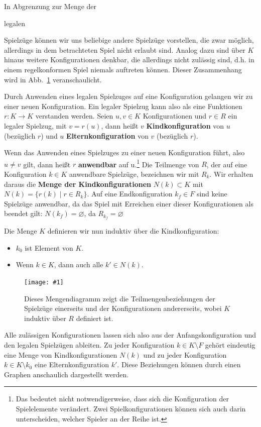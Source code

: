 \documentclass[a4paper]{scrartcl}
\let\emptyset\varnothing
\newcommand\e[1]{\begin{em}#1\end{em}}
\newcommand\g[4]{%
  \begin{figure}[!ht]
  \centering
  \texttt{[image: \#1]}
  \caption{#3\label{fig:#2}}
  \end{figure}}
\begin{document}
In Abgrenzung zur Menge der \e{legalen} Spielzüge können wir uns beliebige andere Spielzüge vorstellen, die zwar möglich, allerdings in dem betrachteten Spiel nicht erlaubt sind. Analog dazu sind über $K$ hinaus weitere Konfigurationen denkbar, die allerdings nicht zulässig sind, d.h. in einem regelkonformen Spiel niemals auftreten können. Dieser Zusammenhang wird in Abb.~\ref{fig:venn} veranschaulicht. 

Durch Anwenden eines legalen Spielzuges auf eine Konfiguration gelangen wir zu einer neuen Konfiguration. Ein legaler Spielzug kann also als eine Funktionen $r:K \to K$ verstanden werden. Seien $u,v \in K$ Konfigurationen und $r \in R$ ein legaler Spielzug, mit $v = r(u)$, dann heißt $v$ \textbf{Kindkonfiguration} von $u$ (bezüglich $r$) und $u$ \textbf{Elternkonfiguration} von $v$ (bezüglich $r$). 

Wenn das Anwenden eines Spielzuges zu einer neuen Konfiguration führt, also $u \neq v$ gilt, dann heißt $r$ \textbf{anwendbar} auf u.\footnote{Das bedeutet nicht notwendigerweise, dass sich die Konfiguration der Spielelemente verändert. Zwei Spielkonfigurationen können sich auch darin unterscheiden, welcher Spieler an der Reihe ist.} Die Teilmenge von $R$, der auf eine Konfiguration $k \in K$ anwendbare Spielzüge, bezeichnen wir mit $R_k$. Wir erhalten daraus die \textbf{Menge der Kindkonfigurationen} $N(k) \subset K$ mit $N(k) = \{r(k) \mid r \in R_k\}$. Auf eine Endkonfiguration $k_f \in F$ sind keine Spielzüge anwendbar, da das Spiel mit Erreichen einer dieser Konfigurationen als beendet gilt: $N(k_f) = \emptyset$, da $R_{k_f} = \emptyset$

Die Menge $K$ definieren wir nun induktiv über die Kindkonfiguration: 
\begin{itemize}
	\item $k_0$ ist Element von $K$.
	\item Wenn $k \in K$, dann auch alle $k' \in N(k)$.
\end{itemize}

\g{img/spielzuege.pdf}{venn}{Dieses Mengendiagramm zeigt die Teilmengenbeziehungen der Spielzüge einerseits und der Konfigurationen andererseits, wobei $K$ induktiv über $R$ definiert ist.}{.9}

Alle zulässigen Konfigurationen lassen sich also aus der Anfangskonfiguration und den legalen Spielzügen ableiten. Zu jeder Konfiguration $k \in K \setminus F$ gehört eindeutig eine Menge von Kindkonfigurationen $N(k)$ und zu jeder Konfiguration $k \in K \setminus k_0$ eine Elternkonfiguration $k'$. Diese Beziehungen können durch einen Graphen anschaulich dargestellt werden.
\end{document}
